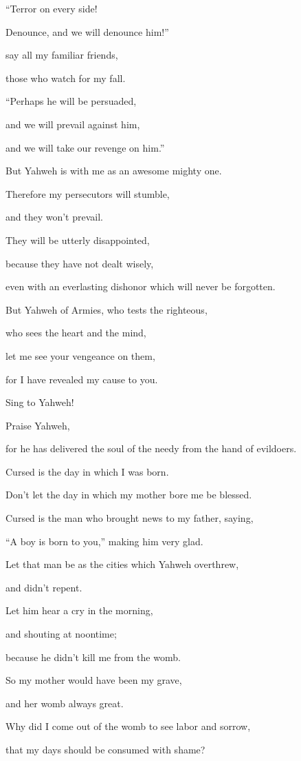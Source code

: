 {\par }{\QB “Terror on every side!
\par }{\QB Denounce, and we will denounce him!”
\par }{\Q say all my familiar friends,
\par }{\QB those who watch for my fall.
\par }{\Q “Perhaps he will be persuaded,
\par }{\QB and we will prevail against him,
\par }{\QB and we will take our revenge on him.”
\par }{\Q {}But Yahweh is with me as an awesome mighty one.
\par }{\QB Therefore my persecutors will stumble,
\par }{\QB and they won’t prevail.
\par }{\Q They will be utterly disappointed,
\par }{\QB because they have not dealt wisely,
\par }{\QB even with an everlasting dishonor which will never be forgotten.
\par }{\Q {}But Yahweh of Armies, who tests the righteous,
\par }{\QB who sees the heart and the mind,
\par }{\Q let me see your vengeance on them,
\par }{\QB for I have revealed my cause to you.
\par }{\Q {}Sing to Yahweh!
\par }{\QB Praise Yahweh,
\par }{\QB for he has delivered the soul of the needy from the hand of evildoers.
\par }{\Q {}Cursed is the day in which I was born.
\par }{\QB Don’t let the day in which my mother bore me be blessed.
\par }{\Q {}Cursed is the man who brought news to my father, saying,
\par }{\QB “A boy is born to you,” making him very glad.
\par }{\Q {}Let that man be as the cities which Yahweh overthrew,
\par }{\QB and didn’t repent.
\par }{\Q Let him hear a cry in the morning,
\par }{\QB and shouting at noontime;
\par }{\Q {}because he didn’t kill me from the womb.
\par }{\QB So my mother would have been my grave,
\par }{\QB and her womb always great.
\par }{\Q {}Why did I come out of the womb to see labor and sorrow,
\par }{\QB that my days should be consumed with shame?

}
